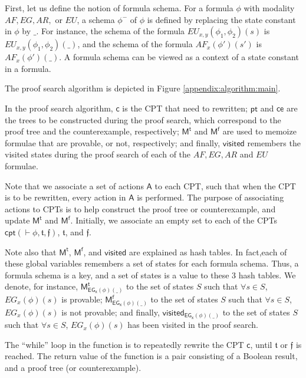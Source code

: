First, let us define the notion of formula schema.
For a \sctlm{} formula $\phi$ with modality $AF, EG, AR, $ or $EU$, a schema $\phi^-$ of $\phi$ is defined by replacing the state constant in $\phi$ by $\_$.
For instance, the schema of the formula $EU_{x,y}(\phi_1,\phi_2)(s)$ is $EU_{x,y}(\phi_1,\phi_2)(\_)$, and the schema of the formula $AF_x(\phi')(s')$ is $AF_x(\phi')(\_)$. A formula schema can be viewed as a context of a state constant in a \sctlm{} formula.

The proof search algorithm is depicted in Figure \ref{appendix:algorithm:main}.

In the proof search algorithm, $\mathsf{c}$ is the \textsf{CPT} that need to rewritten; $\mathsf{pt}$ and $\mathsf{ce}$ are the trees to be constructed during the proof search, which correspond to the proof tree and the counterexample, respectively; $\mathsf{M^t}$ and $\mathsf{M^f}$ are used to memoize formulae that are provable, or not, respectively; and finally, $\mathsf{visited}$ remembers the visited states during the proof search of each of the $AF, EG, AR$ and $EU$ formulae.

Note that we associate a set of actions $\mathsf{A}$ to each \textsf{CPT}, such that when the \textsf{CPT} is to be rewritten, every action in $\mathsf{A}$ is performed. The purpose of associating actions to \textsf{CPT}s is to help construct the proof tree or counterexample, and update $\mathsf{M^t}$ and $\mathsf{M^f}$.
Initially, we associate an empty set to each of the \textsf{CPT}s $\textsf{cpt}(\vdash\phi,\mathfrak{t},\mathfrak{f})$, $\mathfrak{t}$, and $\mathfrak{f}$.

Note also that $\mathsf{M^t}$, $\mathsf{M^f}$, and $\mathsf{visited}$ are explained as hash tables. In fact,each of these global variables remembers a set of states for each formula schema. Thus, a formula schema is a key, and a set of states is a value to these 3 hash tables. We denote, for instance, $\mathsf{M^t_{EG_{x}(\phi)(\_)}}$ to the set of states $S$ such that $\forall s\in S$, $EG_{x}(\phi)(s)$ is provable; $\mathsf{M^f_{EG_{x}(\phi)(\_)}}$ to the set of states $S$ such that $\forall s\in S$, $EG_{x}(\phi)(s)$ is not provable; and finally, $\mathsf{visited_{EG_x(\phi)(\_)}}$ to the set of states $S$ such that $\forall s\in S$, $EG_x(\phi)(s)$ has been visited in the proof search.

The ``while'' loop in the function is to repeatedly rewrite the \textsf{CPT} $\mathsf{c}$, until $\mathfrak{t}$ or $\mathfrak{f}$ is reached. The return value of the function is a pair consisting of a Boolean result, and a proof tree (or counterexample). 	


